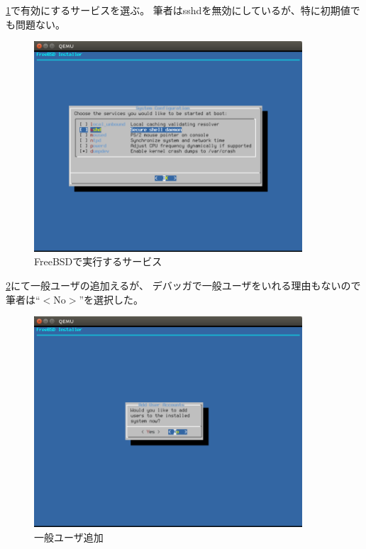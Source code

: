 \documentclass[a4j]{jarticle}
\begin{document}
\begin{multicols}{2}
\ref{fig:FreeBSD_Service}で有効にするサービスを選ぶ。
筆者はsshdを無効にしているが、特に初期値でも問題ない。
\begin{figure}[htbp]
	\begin{center}
    	\includegraphics[width=10cm]{./IMG/FreeBSD_SYS.png}
	\end{center}
    \caption{FreeBSDで実行するサービス}
    \label{fig:FreeBSD_Service}
\end{figure}

\ref{fig:FreeBSD_ADD_U}にて一般ユーザの追加えるが、
デバッガで一般ユーザをいれる理由もないので筆者は``$<$No$>$''を選択した。
\begin{figure}[htbp]
	\begin{center}
    	\includegraphics[width=10cm]{./IMG/FreeBSD_ADD_USER.png}
	\end{center}
    \caption{一般ユーザ追加}
    \label{fig:FreeBSD_ADD_U}
\end{figure}
\clearpage

\newpage
\end{multicols}
\end{document}
